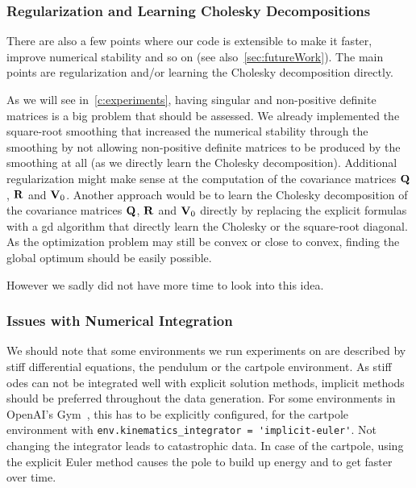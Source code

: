 
		\subsubsection{Regularization and Learning Cholesky Decompositions}
			\label{subsubsec:implRegularization}

			There are also a few points where our code is extensible to make it faster, improve numerical stability and so on (see also~\autoref{sec:futureWork}). The main points are regularization and/or learning the Cholesky decomposition directly.

			As we will see in~\autoref{c:experiments}, having singular and non-positive definite matrices is a big problem that should be assessed. We already implemented the square-root smoothing that increased the numerical stability through the smoothing by not allowing non-positive definite matrices to be produced by the smoothing at all (as we directly learn the Cholesky decomposition). Additional regularization might make sense at the computation of the covariance matrices \(\boldsymbol{\mathrm{Q}}\), \(\boldsymbol{\mathrm{R}}\) and \(\boldsymbol{\mathrm{V}}_0\). Another approach would be to learn the Cholesky decomposition of the covariance matrices \(\boldsymbol{\mathrm{Q}}\), \(\boldsymbol{\mathrm{R}}\) and \(\boldsymbol{\mathrm{V}}_0\) directly by replacing the explicit formulas with a \ac{gd} algorithm that directly learn the Cholesky or the square-root diagonal. As the optimization problem may still be convex or close to convex, finding the global optimum should be easily possible.

			However we sadly did not have more time to look into this idea.

		\subsubsection{Issues with Numerical Integration}
			\label{subsubsec:integrationProblems}

			We should note that some environments we run experiments on are described by stiff differential equations, \eg the pendulum or the cartpole environment. As stiff \acp{ode} can not be integrated well with explicit solution methods, implicit methods should be preferred throughout the data generation. For some environments in OpenAI's Gym~\cite{brockmanOpenAIGym2016}, this has to be explicitly configured, \eg for the cartpole environment with \lstinline|env.kinematics_integrator = 'implicit-euler'|. Not changing the integrator leads to catastrophic data. In case of the cartpole, using the explicit Euler method causes the pole to build up energy and to get faster over time.

